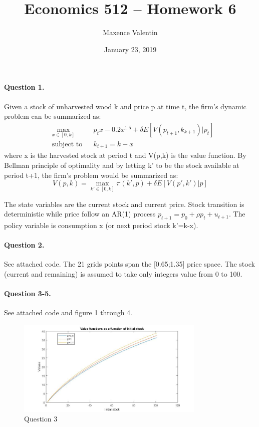 \documentclass[11pt]{article}
\begin{document}
\onehalfspace

\title{Economics 512 -- Homework 6}
\author{Maxence Valentin}
\date{January 23, 2019}
\maketitle

\paragraph{Question 1.}

Given a stock of unharvested wood k and price p at time t, the firm's dynamic problem can be summarized as:
\begin{equation*}
\begin{aligned}
& \underset{x\in[0,k]}{\text{max}} 
& & p_tx - 0.2x^{1.5} + \delta E[V(p_{t+1},k_{k+1})|p_t] \\
& \text{subject to}
& &  k_{t+1} = k - x
\end{aligned}
\end{equation*}
where x is the harvested stock at period t and V(p,k) is the value function. By Bellman principle of optimality and by letting k' to be the stock available at period t+1, the firm's problem would be summarized as:
\begin{equation}
	V(p,k)= \max_{k'\in[0,k]} \pi (k',p) + \delta E[V(p',k')|p] 
\end{equation}

The state variables are the current stock and current price. Stock transition is deterministic while price follow an AR(1) process $p_{t+1} = p_0 + \rho p_t + u_{t+1}$. The policy variable is consumption x (or next period stock k'=k-x). 


\paragraph{Question 2.} See attached code. The 21 grids points span the [0.65;1.35] price space. The stock (current and remaining) is assumed to take only integers value from 0 to 100. 

\paragraph{Question 3-5.} See attached code and figure 1 through 4.

\begin{figure}[!h]
	\centering
	\includegraphics[width=0.8\textwidth]{Figures/figure1.jpg}
	\caption{Question 3}
\end{figure}
\end{document}
